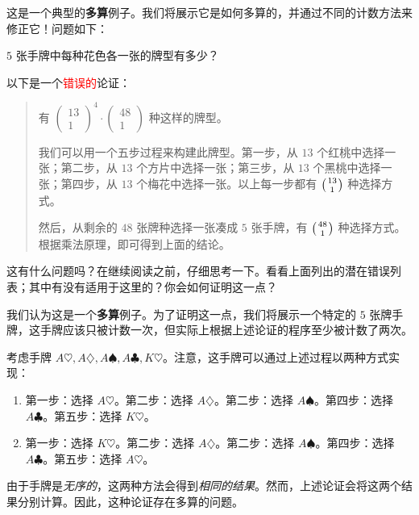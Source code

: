 \begin{example}
    这是一个典型的\textbf{多算}例子。我们将展示它是如何多算的，并通过不同的计数方法来修正它！问题如下：

    $5$ 张手牌中每种花色各一张的牌型有多少？

    以下是一个\textcolor{red}{错误的}论证：

    \begin{quote}\color{red}
        有 $\begin{pmatrix}
                13 \\
                1
            \end{pmatrix}^4 \cdot \begin{pmatrix}
                48 \\
                1
            \end{pmatrix}$ 种这样的牌型。

        我们可以用一个五步过程来构建此牌型。第一步，从 $13$ 个红桃中选择一张；第二步，从 $13$ 个方片中选择一张；第三步，从 $13$ 个黑桃中选择一张；第四步，从 $13$ 个梅花中选择一张。以上每一步都有 $\big({13 \atop 1}\big)$ 种选择方式。

        然后，从剩余的 $48$ 张牌种选择一张凑成 $5$ 张手牌，有 $\big({48 \atop 1}\big)$ 种选择方式。根据乘法原理，即可得到上面的结论。
    \end{quote}


    这有什么问题吗？在继续阅读之前，仔细思考一下。看看上面列出的潜在错误列表；其中有没有适用于这里的？你会如何证明这一点？

    我们认为这是一个\textbf{多算}例子。为了证明这一点，我们将展示一个特定的 $5$ 张牌手牌，这手牌应该只被计数一次，但实际上根据上述论证的程序至少被计数了两次。

    考虑手牌 $A\heartsuit, A\diamondsuit, A\spadesuit, A\clubsuit, K\heartsuit$。注意，这手牌可以通过上述过程以两种方式实现：
    \begin{enumerate}[label=(\arabic*)]
        \item 第一步：选择 $A\heartsuit$。第二步：选择 $A\diamondsuit$。第二步：选择 $A\spadesuit$。第四步：选择 $A\clubsuit$。第五步：选择 $K\heartsuit$。
        \item 第一步：选择 $K\heartsuit$。第二步：选择 $A\diamondsuit$。第二步：选择 $A\spadesuit$。第四步：选择 $A\clubsuit$。第五步：选择 $A\heartsuit$。
    \end{enumerate}
    由于手牌是\emph{无序的}，这两种方法会得到\emph{相同的结果}。然而，上述论证会将这两个结果分别计算。因此，这种论证存在多算的问题。


\end{example}
